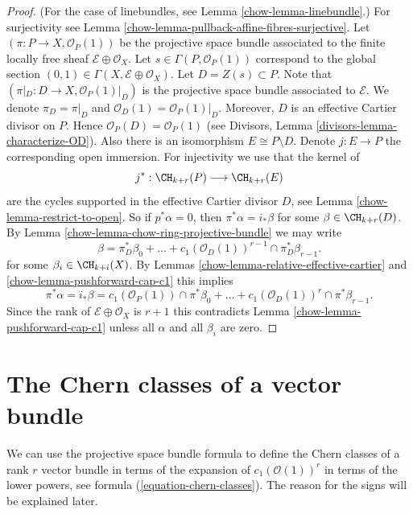 \begin{proof}

(For the case of linebundles, see Lemma \ref{chow-lemma-linebundle}.)
For surjectivity see Lemma \ref{chow-lemma-pullback-affine-fibres-surjective}.
Let $(\pi  : P \to X, \mathcal{O}_P(1))$
be the projective space bundle associated
to the finite locally free sheaf $\mathcal{E} \oplus \mathcal{O}_X$.
Let $s \in \Gamma(P, \mathcal{O}_P(1))$ correspond to the global
section $(0, 1) \in \Gamma(X, \mathcal{E} \oplus \mathcal{O}_X)$.
Let $D = Z(s) \subset P$. Note that
$(\pi|_D : D \to X , \mathcal{O}_P(1)|_D)$
is the projective space bundle associated
to $\mathcal{E}$. We denote $\pi_D = \pi|_D$ and
$\mathcal{O}_D(1) = \mathcal{O}_P(1)|_D$.
Moreover, $D$ is an effective
Cartier divisor on $P$. Hence $\mathcal{O}_P(D) = \mathcal{O}_P(1)$
(see Divisors, Lemma \ref{divisors-lemma-characterize-OD}).
Also there is an isomorphism
$E \cong P \setminus D$. Denote $j : E \to P$ the
corresponding open immersion.
For injectivity we use that the kernel of
$$
j^* :
\CH_{k + r}(P)
\longrightarrow
\CH_{k + r}(E)
$$
are the cycles supported in the effective Cartier divisor $D$,
see Lemma \ref{chow-lemma-restrict-to-open}. So if $p^*\alpha = 0$, then
$\pi^*\alpha = i_*\beta$ for some $\beta \in \CH_{k + r}(D)$.
By Lemma \ref{chow-lemma-chow-ring-projective-bundle} we may write
$$
\beta = \pi_D^*\beta_0 +
\ldots + c_1(\mathcal{O}_D(1))^{r - 1} \cap \pi_D^* \beta_{r - 1}.
$$
for some $\beta_i \in \CH_{k + i}(X)$.
By Lemmas \ref{chow-lemma-relative-effective-cartier}
and \ref{chow-lemma-pushforward-cap-c1}
this implies
$$
\pi^*\alpha = i_*\beta =
c_1(\mathcal{O}_P(1)) \cap \pi^*\beta_0 +
\ldots +
c_1(\mathcal{O}_D(1))^r \cap \pi^*\beta_{r - 1}.
$$
Since the rank of $\mathcal{E} \oplus \mathcal{O}_X$ is $r + 1$
this contradicts Lemma \ref{chow-lemma-pushforward-cap-c1} unless all
$\alpha$ and all $\beta_i$ are zero.
\end{proof}

\section{The Chern classes of a vector bundle}
\label{chow-section-chern-classes-vector-bundles}
We can use the projective space bundle formula to define the
Chern classes of a rank $r$ vector bundle in terms of the expansion
of $c_1(\mathcal{O}(1))^r$ in terms of the lower powers, see
formula (\ref{equation-chern-classes}).
The reason for the signs will be explained later.

